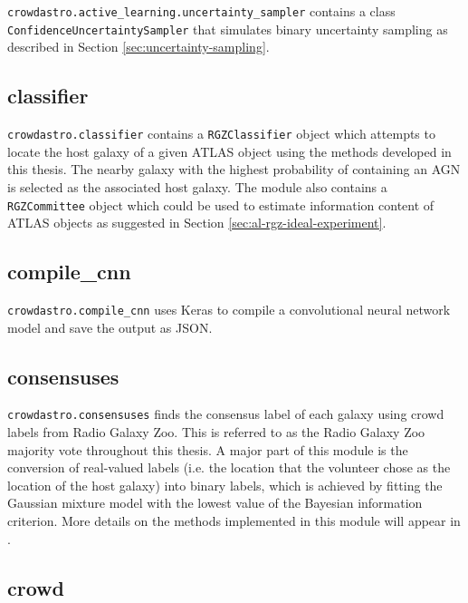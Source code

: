             \texttt{crowdastro.active\_learning.uncertainty\_sampler} contains a
            class \texttt{ConfidenceUncertaintySampler} that simulates binary
            uncertainty sampling as described in Section
            \ref{sec:uncertainty-sampling}.

    \subsection{classifier}

        \texttt{crowdastro.classifier} contains a \texttt{RGZClassifier} object
        which attempts to locate the host galaxy of a given ATLAS object using
        the methods developed in this thesis. The nearby galaxy with the highest
        probability of containing an AGN is selected as the associated host
        galaxy. The module also contains a \texttt{RGZCommittee} object which
        could be used to estimate information content of ATLAS objects as
        suggested in Section \ref{sec:al-rgz-ideal-experiment}.

    \subsection{compile\_cnn}

        \texttt{crowdastro.compile\_cnn} uses Keras to compile a convolutional
        neural network model and save the output as JSON.

    \subsection{consensuses}

        \texttt{crowdastro.consensuses} finds the consensus label of each galaxy
        using crowd labels from Radio Galaxy Zoo. This is referred to as the
        Radio Galaxy Zoo majority vote throughout this thesis. A major part of
        this module is the conversion of real-valued labels (i.e. the location
        that the volunteer chose as the location of the host galaxy) into binary
        labels, which is achieved by fitting the Gaussian mixture model with the
        lowest value of the Bayesian information criterion. More details on the
        methods implemented in this module will appear in \citet{atlas-ml}.

    \subsection{crowd}
    \label{sec:crowdastro-crowd}

